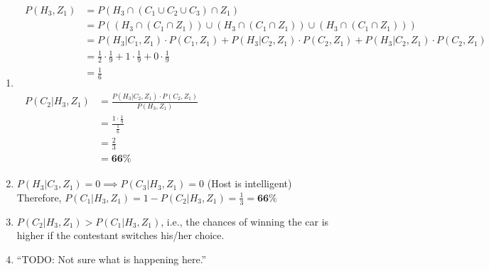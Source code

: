 \documentclass[11pt]{article}
\begin{document}
\begin{enumerate}[label=(\alph*)]
    \item
          \begin{align*}
              \begin{split}
                  P(H_3, Z_1) &= P(H_3 \cap (C_1 \cup C_2 \cup C_3) \cap Z_1) \\
                  &= P((H_3 \cap (C_1 \cap Z_1)) \cup (H_3 \cap (C_1 \cap Z_1)) \cup (H_3 \cap (C_1 \cap Z_1))) \\
                  &= P(H_3|C_1,Z_1) \cdot P(C_1,Z_1) + P(H_3|C_2,Z_1) \cdot P(C_2,Z_1) + P(H_3|C_2,Z_1) \cdot P(C_2,Z_1) \\
                  &= \frac{1}{2} \cdot \frac{1}{9} + 1 \cdot \frac{1}{9} + 0 \cdot \frac{1}{9} \\
                  &= \frac{1}{6}
              \end{split} \\\\
              \begin{split}
                  P(C_2|H_3, Z_1) &= \frac{P(H_3|C_2, Z_1) \cdot P(C_2, Z_1)}{P(H_3, Z_1)} \\
                  &= \frac{1 \cdot \frac{1}{9}}{\frac{1}{6}} \\
                  &= \frac{2}{3} \\
                  &= \mathbf{66\%}
              \end{split}
          \end{align*}

    \item
          $P(H_3|C_3,Z_1) = 0 \implies P(C_3|H_3, Z_1)=0$ \hspace{1em} (Host is intelligent)\\
          Therefore, $P(C_1|H_3, Z_1) = 1 - P(C_2|H_3, Z_1) = \frac{1}{3} = \mathbf{66\%}$

    \item
          $P(C_2|H_3, Z_1) > P(C_1|H_3, Z_1)$, i.e., the chances of winning the car is higher if the contestant switches his/her choice.

    \item ``TODO: Not sure what is happening here.''

\end{enumerate}

\newpage
\end{document}
